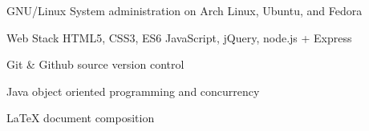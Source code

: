 

\begin{cvskills}

  \cvskill
    {GNU/Linux} %
    {System administration on Arch Linux, Ubuntu, and Fedora} %

  \cvskill
    {Web Stack} %
    {HTML5, CSS3, ES6 JavaScript, jQuery, node.js + Express} %

  \cvskill
    {Git \& Github} %
    {source version control} %

  \cvskill
    {Java} %
    {object oriented programming and concurrency} %

  \cvskill
    {LaTeX} %
    {document composition} %

\end{cvskills}